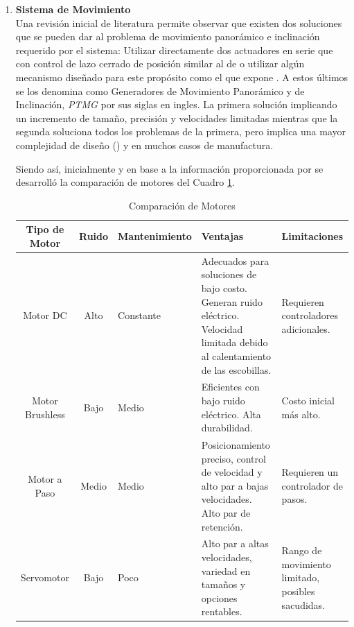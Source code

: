 \begin{enumerate}[label=\alph*)]
    \item \textbf{Sistema de Movimiento} \\
    Una revisión inicial de literatura permite observar que existen dos soluciones que se pueden dar al problema de movimiento panorámico e inclinación requerido por el sistema: Utilizar directamente dos actuadores en serie que con control de lazo cerrado de posición similar al de \textcite{Yosafat2017} o utilizar algún mecanismo diseñado para este propósito como el que expone \textcite{diff_pan_tilt_youtube}. A estos últimos se los denomina como Generadores de Movimiento Panorámico y de Inclinación, \textit{PTMG} por sus siglas en ingles. La primera solución implicando un incremento de tamaño, precisión y velocidades limitadas mientras que la segunda soluciona todos los problemas de la primera, pero implica una mayor complejidad de diseño (\cite{Alizadeh2010}) y en muchos casos de manufactura.

    Siendo así, inicialmente y en base a la información proporcionada por \textcite{motorSelection} se desarrolló la comparación de motores del Cuadro \ref{tab:motor-comparison}.
    
    \begin{table}[H]
        \centering
        \begin{tabularx}{\textwidth}{|c|c|X|X|X|}
            \hline
            \textbf{Tipo de Motor} & \textbf{Ruido} & \textbf{Mantenimiento} & \textbf{Ventajas} & \textbf{Limitaciones} \\
            \hline
            Motor DC & Alto & Constante & Adecuados para soluciones de bajo costo. Generan ruido eléctrico. Velocidad limitada debido al calentamiento de las escobillas. & Requieren controladores adicionales. \\
            \hline
            Motor Brushless & Bajo & Medio & Eficientes con bajo ruido eléctrico. Alta durabilidad. & Costo inicial más alto. \\
            \hline
            Motor a Paso & Medio & Medio & Posicionamiento preciso, control de velocidad y alto par a bajas velocidades. Alto par de retención. & Requieren un controlador de pasos. \\
            \hline
            Servomotor & Bajo & Poco & Alto par a altas velocidades, variedad en tamaños y opciones rentables. & Rango de movimiento limitado, posibles sacudidas. \\
            \hline
        \end{tabularx}
        \caption{Comparación de Motores}
        \label{tab:motor-comparison}
    \end{table}


\end{enumerate}

